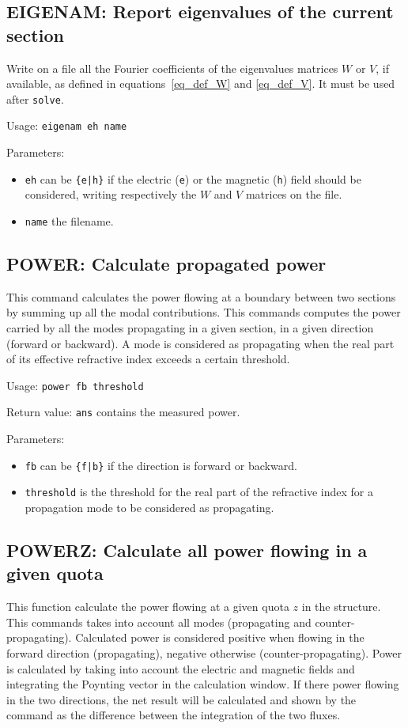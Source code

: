 \subsection{EIGENAM: Report eigenvalues of the current section} 
    Write on a file all the Fourier coefficients of the eigenvalues
    matrices $W$ or $V$, if available, as defined in equations~\eqref{eq_def_W} and \eqref{eq_def_V}. It must be used after \lstinline!solve!.
        
    Usage: \lstinline!eigenam eh name!
    
    Parameters:
    \begin{itemize}
    \item \lstinline!eh! can be \lstinline!{e|h}! if the electric (\lstinline!e!) or the magnetic (\lstinline!h!) field should be considered, writing respectively the $W$ and $V$ matrices on the file.
    \item \lstinline!name! the filename. 
    \end{itemize}
    
\subsection{POWER: Calculate propagated power}  
This command calculates the power flowing at a boundary between two sections by summing up all the modal contributions. This commands computes the power carried by all the modes propagating in  a given section, in a given direction (forward or backward).  A mode is considered as propagating when the real part of its effective refractive index exceeds a certain threshold. 
 
Usage:  \lstinline!power fb threshold! 

Return value: \lstinline!ans! contains the measured power.
     
Parameters: 
\begin{itemize}
\item \lstinline!fb! can be \lstinline!{f|b}! if the direction is forward or backward. 
\item \lstinline!threshold! is the threshold for the real part of the refractive index for a propagation mode to be considered as propagating.
\end{itemize}

\subsection{POWERZ: Calculate all power flowing in a given quota}
\label{subsec_powerz}
This function calculate the power flowing at a given quota $z$ in the structure. This commands takes into account all modes (propagating and counter-propagating). 
Calculated power is considered positive when flowing in the forward direction (propagating), negative otherwise (counter-propagating). Power is calculated by taking into account the electric and magnetic fields and integrating the Poynting vector in the calculation window.
If there power flowing in the two directions, the net result will
be calculated and shown by the command as the difference between the integration of the two fluxes.

